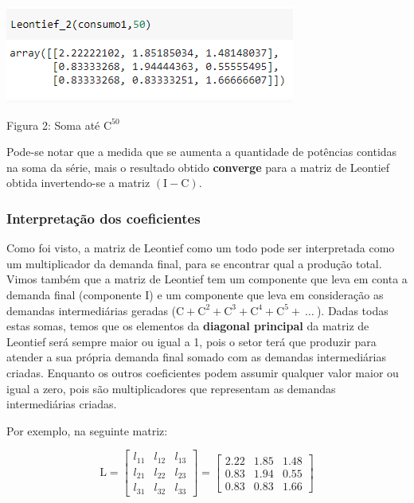 \documentclass[a4paper, 12pt]{article}
\begin{document}
 \begin{center}
    \includegraphics{pot_50.PNG}
    
    Figura 2: Soma até $\mathrm{C^{50}}$
\end{center}

Pode-se notar que a medida que se aumenta a quantidade de potências contidas na soma da série, mais o resultado obtido \textbf{converge} para a matriz de Leontief obtida invertendo-se a matriz $(\mathrm{I-C})$.


\subsubsection{Interpretação dos coeficientes}

Como foi visto, a matriz de Leontief como um todo pode ser interpretada como um multiplicador da demanda final, para se encontrar qual a produção total. Vimos também que a matriz de Leontief tem um componente que leva em conta a demanda final (componente $\mathrm{I}$) e um componente que leva em consideração as demandas intermediárias geradas ($\mathrm{C}+\mathrm{C^2}+\mathrm{C^3}+\mathrm{C^4}+\mathrm{C^5}+\ \dots \ $). Dadas todas estas somas, temos que os elementos da \textbf{diagonal principal} da matriz de Leontief será sempre maior ou igual a 1, pois o setor terá que produzir para atender a sua própria demanda final somado com as demandas intermediárias criadas. Enquanto os outros coeficientes podem assumir qualquer valor maior ou igual a zero, pois são multiplicadores que representam as demandas intermediárias criadas.

Por exemplo, na seguinte matriz:

$$\mathrm{L} = \begin{bmatrix}
l_{11}&l_{12}&l_{13}\\
l_{21}&l_{22}&l_{23}\\
l_{31}&l_{32}&l_{33}
\end{bmatrix} = \begin{bmatrix}
2.22&1.85&1.48\\
0.83&1.94&0.55\\
0.83&0.83&1.66
\end{bmatrix}$$
\end{document}
